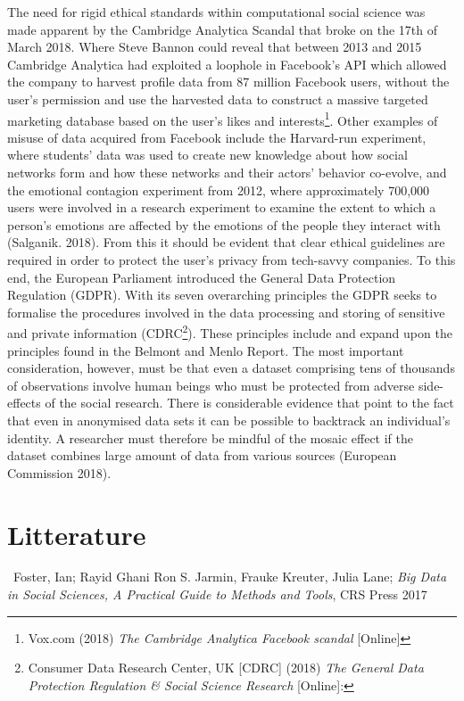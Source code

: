 \documentclass[12pt,a4paper]{article}
\begin{document}
The need for rigid ethical standards within computational social science was made apparent by the Cambridge Analytica Scandal that broke on the 17th of March 2018. Where Steve Bannon could reveal that between 2013 and 2015 Cambridge Analytica had exploited a loophole in Facebook’s API which allowed the company to harvest profile data from 87 million Facebook users, without the user’s permission and use the harvested data to construct a massive targeted marketing database based on the user’s likes and interests\footnote{Vox.com (2018) \textit{The Cambridge Analytica Facebook scandal} [Online]}. Other examples of misuse of data acquired from Facebook include the Harvard-run experiment, where students' data was used to create new knowledge about how social networks form and how these networks and their actors' behavior co-evolve, and the emotional contagion experiment from 2012, where approximately 700,000 users were involved in a research experiment to examine the extent to which a person's emotions are affected by the emotions of the people they interact with (Salganik. 2018).\newline
From this it should be evident that clear ethical guidelines are required in order to protect the user's privacy from tech-savvy companies. To this end, the European Parliament introduced the General Data Protection Regulation (GDPR). With its seven overarching principles the GDPR seeks to formalise the procedures involved in the data processing and storing of sensitive and private information (CDRC\footnote{Consumer Data Research Center, UK  [CDRC] (2018) \textit{The General Data Protection Regulation \& Social Science Research} [Online]:}). These principles include and expand upon the principles found in the Belmont and Menlo Report. The most important consideration, however, must be that even a dataset comprising tens of thousands of observations involve human beings who must be protected from adverse side-effects of the social research. There is considerable evidence that point to the fact that even in anonymised data sets it can be possible to backtrack an individual's identity. A researcher must therefore be mindful of the mosaic effect if the dataset combines large amount of data from various sources (European Commission 2018).

\newpage
\section{Litterature}
\ Foster, Ian; Rayid Ghani Ron S. Jarmin, Frauke Kreuter, Julia Lane; \textit{Big Data in Social Sciences, A Practical Guide to Methods and Tools}, CRS Press 2017 \newline
\end{document}
